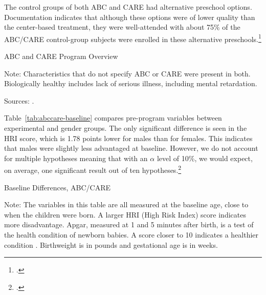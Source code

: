 The control groups of both ABC and CARE had alternative preschool options. Documentation indicates that although these options were of lower quality than the center-based treatment, they were well-attended with about 75\% of the ABC/CARE control-group subjects were enrolled in these alternative preschools.\footnote{\citet{Burchinal_etal_1989_CD_Daycare-Pre-K-Dev,Garcia_etal_2016_Comp_CBA_Unpublished}.}


\begin{table}[H]
\centering
\caption{ABC and CARE Program Overview}
\label{tab:abc-care-characteristics}
\begin{threeparttable}
	
\begin{tablenotes}
\item Note: Characteristics that do not specify ABC or CARE were present in both. Biologically healthy includes lack of serious illness, including mental retardation.
\item Sources: \citet{Ramey_Collier_etal_1976_CarolinaAbecedarianProject,Ramey_Smith_1977_AJMD,Ramey_etal_1985_Project-CARE_TiECSE,Wasik_Ramey_etal_1990_CD,Ramey_Campbell_1991_childreninpoverty}.
\end{tablenotes}
\end{threeparttable}
\end{table}

Table~\ref{tab:abccare-baseline} compares pre-program variables between experimental and gender groups. The only significant difference is seen in the HRI score, which is 1.78 points lower for males than for females. This indicates that males were slightly less advantaged at baseline. However, we do not account for multiple hypotheses meaning that with an $\alpha$ level of 10\%, we would expect, on average, one significant result out of ten hypotheses.\footnote{\citet{Romano_Wolf_2005_JASA}.}

\begin{table}[H]
\centering
\caption{Baseline Differences, ABC/CARE}
\label{tab:abccare-baseline}
\begin{threeparttable}
	
\begin{tablenotes}
\footnotesize
\item Note: The variables in this table are all measured at the baseline age, close to when the children were born. A larger HRI (High Risk Index) score indicates more disadvantage. Apgar, measured at 1 and 5 minutes after birth, is a test of the health condition of newborn babies. A score closer to 10 indicates a healthier condition \citep{Apgar_1966_APGAR-Scoring_PCNA}. Birthweight is in pounds and gestational age is in weeks. 
\end{tablenotes}
\end{threeparttable}
\end{table}

